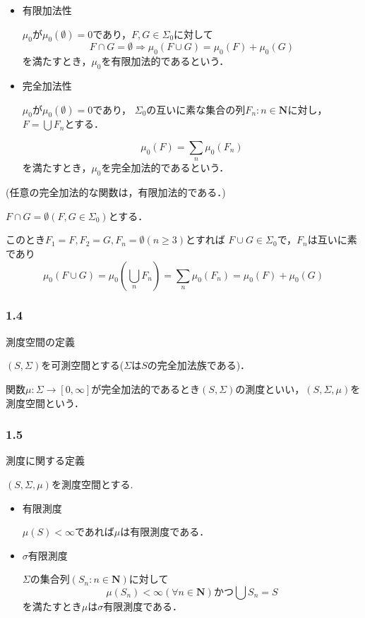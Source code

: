 \documentclass{jsarticle}
\begin{document}
\begin{itemize}
    \item 有限加法性 \par
        $\mu_0$が$\mu_0(\emptyset)=0$であり，$F,G\in\Sigma_0$に対して
        \begin{equation}
            F\cap G = \emptyset \Rightarrow \mu_0(F\cup G)=\mu_0(F)+\mu_0(G) \nonumber
        \end{equation}
        を満たすとき，$\mu_0$を有限加法的であるという．
    \item 完全加法性 \par
        $\mu_0$が$\mu_0(\emptyset)=0$であり，
        $\Sigma_0$の互いに素な集合の列$F_n:n\in\mathbf{N}$に対し，$F=\bigcup F_n$とする．
    
        \begin{equation}
            \mu_0(F)=\sum_n \mu_0(F_n) \nonumber
        \end{equation}
        を満たすとき，$\mu_0$を完全加法的であるという．
\end{itemize}

(任意の完全加法的な関数は，有限加法的である．)

\begin{itembox}[l]{}
$F\cap G = \emptyset(F,G\in\Sigma_0)$とする．

このとき$F_1=F,F_2=G,F_n=\emptyset(n\geq 3)$とすれば
$F\cup G\in\Sigma_0$で，$F_n$は互いに素であり
    \begin{equation}
        \mu_0(F\cup G)=\mu_0(\bigcup_n F_n)=\sum_n\mu_0(F_n)=\mu_0(F)+\mu_0(G) \nonumber
    \end{equation}
\end{itembox}


\subsubsection*{1.4}
測度空間の定義

$(S,\Sigma)$を可測空間とする($\Sigma$は$S$の完全加法族である)．

関数$\mu:\Sigma\to[0,\infty]$が完全加法的であるとき$(S,\Sigma)$の測度といい，$(S,\Sigma,\mu)$を測度空間という．

\subsubsection*{1.5}
測度に関する定義

$(S,\Sigma,\mu)$を測度空間とする.
\begin{itemize}
    \item 有限測度 \par
        $\mu(S)<\infty$であれば$\mu$は有限測度である．
    \item $\sigma$有限測度 \par
        $\Sigma$の集合列$({S_n}:n\in\mathbf{N})$に対して
        \begin{equation}
            \mu(S_n)<\infty(\forall n\in\mathbf{N})かつ\bigcup S_n=S \nonumber
        \end{equation}
        を満たすとき$\mu$は$\sigma$有限測度である．
\end{itemize}
\end{document}
